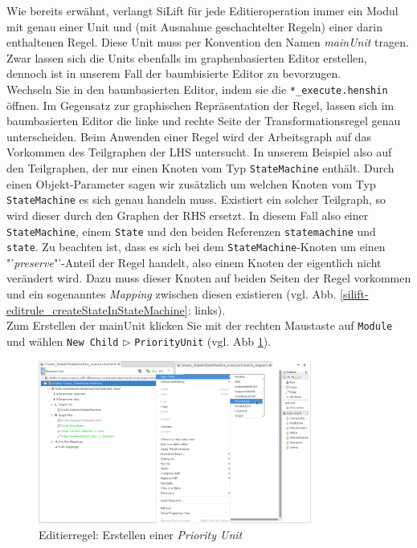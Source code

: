 Wie bereits erwähnt, verlangt SiLift für jede Editieroperation immer ein Modul mit genau einer Unit und (mit Ausnahme geschachtelter Regeln) einer darin enthaltenen Regel.
Diese Unit muss per Konvention den Namen \textit{mainUnit} tragen.\\
Zwar lassen sich die Units ebenfalls im graphenbasierten Editor erstellen, dennoch ist in unserem Fall der baumbisierte Editor zu bevorzugen.\\
Wechseln Sie in den baumbasierten Editor, indem sie die \texttt{*\_execute.henshin} öffnen.
Im Gegensatz zur graphischen Repräsentation der Regel, lassen sich im baumbasierten Editor die linke und rechte Seite der Transformationsregel genau unterscheiden.
Beim Anwenden einer Regel wird der Arbeitsgraph auf das Vorkommen des Teilgraphen der LHS untersucht. In unserem Beispiel also auf den Teilgraphen, der nur  einen Knoten vom Typ \texttt{StateMachine} enthält.
Durch einen Objekt-Parameter sagen wir zusätzlich um welchen Knoten vom Typ \texttt{StateMachine} es sich genau handeln muss.
Existiert ein solcher Teilgraph, so wird dieser durch den Graphen der RHS ersetzt.
In diesem Fall also einer \texttt{StateMachine}, einem \texttt{State} und den beiden Referenzen \texttt{statemachine} und \texttt{state}.
Zu beachten ist, dass es sich bei dem \texttt{StateMachine}-Knoten um einen "'\textit{preserve}"'-Anteil der Regel handelt, also einem Knoten der eigentlich nicht verändert wird. 
Dazu muss dieser Knoten auf beiden Seiten der Regel vorkommen und ein sogenanntes \textit{Mapping} zwischen diesen existieren (vgl. Abb. \ref{silift-editrule_createStateInStateMachine}: links).\\
Zum Erstellen der mainUnit klicken Sie mit der rechten Maustaste auf \texttt{Module} und wählen \texttt{New Child} $\triangleright$ \texttt{PriorityUnit} (vgl. Abb \ref{silift-editrule_create_priority_unit}).

\begin{figure}[H]
\centering
\includegraphics[width=0.8\textwidth]{editrules/graphics/silift-editrule_create_priority_unit.png}
\caption{Editierregel: Erstellen einer \textit{Priority Unit}}
\label{silift-editrule_create_priority_unit}
\end{figure}

